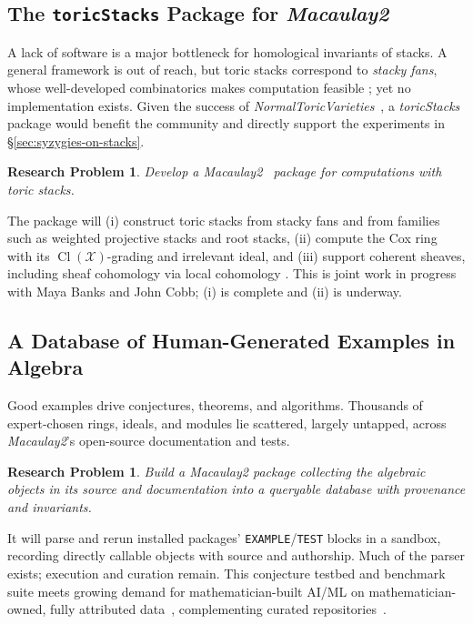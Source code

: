 \documentclass[11pt,reqno]{amsart}
\newtheorem{problem}[lemma]{Research Problem}
\theoremstyle{remark}
\newcommand{\Cl}{\operatorname{Cl}}
\newcommand{\cX}{\mathcal{X}}
\begin{document}
 \subsection{The \texttt{toricStacks} Package for \textit{Macaulay2}}

A lack of software is a major bottleneck for homological invariants of stacks. A general framework is out of reach, but toric stacks correspond to \emph{stacky fans}, whose well-developed combinatorics makes computation feasible \cite{toricStacks1,toricStacks2,borisovChenSmith05}; yet no implementation exists. Given the success of \textit{NormalToricVarieties}~\cite{NormalToricVarietiesSource}, a \textit{toricStacks} package would benefit the community and directly support the experiments in \S\ref{sec:syzygies-on-stacks}.

\begin{problem}\label{prob:toric-stacks-m2}
Develop a \textit{Macaulay2}~\cite{M2} package for computations with toric stacks.
\end{problem}

The package will (i) construct toric stacks from stacky fans and from families such as weighted projective stacks and root stacks, (ii) compute the Cox ring with its $\Cl(\cX)$-grading and irrelevant ideal, and (iii) support coherent sheaves, including sheaf cohomology via local cohomology \cite{EMS00}. This is joint work in progress with Maya Banks and John Cobb; (i) is complete and (ii) is underway.

 \subsection{A Database of Human-Generated Examples in Algebra}
Good examples drive conjectures, theorems, and algorithms. Thousands of expert-chosen rings, ideals, and modules lie scattered, largely untapped, across \textit{Macaulay2}'s open-source documentation and tests.
 
\begin{problem}\label{prob:database-m2}
	Build a \textit{Macaulay2} package collecting the algebraic objects in its source and documentation into a queryable database with provenance and invariants.
\end{problem}

It will parse and rerun installed packages' \texttt{EXAMPLE}/\texttt{TEST} blocks in a sandbox, recording directly callable objects with source and authorship. Much of the parser exists; execution and curation remain. This conjecture testbed and benchmark suite meets growing demand for mathematician-built AI/ML on mathematician-owned, fully attributed data~\cite{commelin26}, complementing curated repositories~\cite{LMFDB,fevolaGoergen22}.
\end{document}
